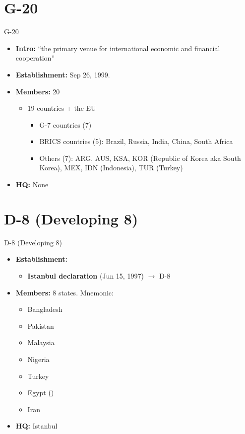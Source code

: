 \documentclass[
  12pt,
  ignorenonframetext,
  progressbar=frametitle]{beamer}
\providecommand{\tightlist}{%
  \setlength{\itemsep}{0pt}\setlength{\parskip}{0pt}}
\begin{document}
\section{G-20}
\begin{frame}[allowframebreaks]
{G-20}
\protect\hypertarget{g-20}{}
\begin{itemize}
\tightlist
\item
  \textbf{Intro:} ``the primary venue for international economic and
  financial cooperation''
\item
  \textbf{Establishment:} Sep 26, 1999.
\item
  \textbf{Members:} 20

  \begin{itemize}
  \tightlist
  \item
    19 countries + the EU

    \begin{itemize}
    \tightlist
    \item
      G-7 countries (7)
    \item
      BRICS countries (5): Brazil, Russia, India, China, South Africa
    \item
      Others (7): ARG, AUS, KSA, KOR (Republic of Korea aka South
      Korea), MEX, IDN (Indonesia), TUR (Turkey)
    \end{itemize}
  \end{itemize}
\item
  \textbf{HQ:} None
\end{itemize}
\end{frame}

\section{D-8 (Developing 8)}
\begin{frame}[allowframebreaks]
{D-8 (Developing 8)}
\protect\hypertarget{d-8-developing-8}{}
\begin{itemize}
\tightlist
\item
  \textbf{Establishment:}

  \begin{itemize}
  \tightlist
  \item
    \textbf{Istanbul declaration} (Jun 15, 1997) \(\rightarrow\) D-8
  \end{itemize}
\item
  \textbf{Members:} 8 states. Mnemonic: 

  \begin{itemize}
  \tightlist
  \item
    Bangladesh
  \item
    Pakistan
  \item
    Malaysia
  \item
    Nigeria
  \item
    Turkey
  \item
    Egypt ()
  \item
    Iran
  \end{itemize}
\item
  \textbf{HQ:} Istanbul
\end{itemize}
\end{frame}
\end{document}
